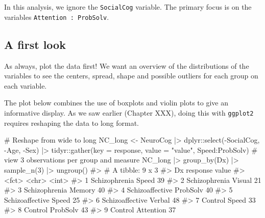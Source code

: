 \documentclass[
  letterpaper,
  10pt,
  krantz2]{krantz}
\makeatletter
\newenvironment{Shaded}{\begin{snugshade}}{\end{snugshade}}
\newcommand{\AttributeTok}[1]{\textcolor[rgb]{0.40,0.45,0.13}{#1}}
\newcommand{\CommentTok}[1]{\textcolor[rgb]{0.37,0.37,0.37}{#1}}
\newcommand{\DecValTok}[1]{\textcolor[rgb]{0.68,0.00,0.00}{#1}}
\newcommand{\FunctionTok}[1]{\textcolor[rgb]{0.28,0.35,0.67}{#1}}
\newcommand{\NormalTok}[1]{\textcolor[rgb]{0.00,0.23,0.31}{#1}}
\newcommand{\OtherTok}[1]{\textcolor[rgb]{0.00,0.23,0.31}{#1}}
\newcommand{\SpecialCharTok}[1]{\textcolor[rgb]{0.37,0.37,0.37}{#1}}
\newcommand{\StringTok}[1]{\textcolor[rgb]{0.13,0.47,0.30}{#1}}
\newenvironment{kframe}{%
  \medskip{}
  \setlength{\fboxsep}{.8em}
  \def\at@end@of@kframe{}%
  \ifinner\ifhmode%
  \def\at@end@of@kframe{\end{minipage}}%
  \begin{minipage}{\columnwidth}%
  \fi\fi%
  \def\FrameCommand##1{\hskip\@totalleftmargin \hskip-\fboxsep
  \colorbox{shadecolor}{##1}\hskip-\fboxsep
      \hskip-\linewidth \hskip-\@totalleftmargin \hskip\columnwidth}%
  \MakeFramed {\advance\hsize-\width
    \@totalleftmargin\z@ \linewidth\hsize
    \@setminipage}}%
{\par\unskip\endMakeFramed%
  \at@end@of@kframe}
\renewenvironment{Shaded}{\begin{kframe}}{\end{kframe}}
\makeatother
\begin{document}
In this analysis, we ignore the \texttt{SocialCog} variable. The primary
focus is on the variables \texttt{Attention\ :\ ProbSolv}.

\hypertarget{a-first-look}{%
\subsection{A first look}\label{a-first-look}}

As always, plot the data first! We want an overview of the distributions
of the variables to see the centers, spread, shape and possible outliers
for each group on each variable.

The plot below combines the use of boxplots and violin plots to give an
informative display. As we saw earlier (Chapter XXX), doing this with
\texttt{ggplot2} requires reshaping the data to long format.

\begin{Shaded}
\begin{Highlighting}[]
\CommentTok{\# Reshape from wide to long}
\NormalTok{NC\_long }\OtherTok{\textless{}{-}}\NormalTok{ NeuroCog }\SpecialCharTok{|\textgreater{}}
\NormalTok{  dplyr}\SpecialCharTok{::}\FunctionTok{select}\NormalTok{(}\SpecialCharTok{{-}}\NormalTok{SocialCog, }\SpecialCharTok{{-}}\NormalTok{Age, }\SpecialCharTok{{-}}\NormalTok{Sex) }\SpecialCharTok{|\textgreater{}}
\NormalTok{  tidyr}\SpecialCharTok{::}\FunctionTok{gather}\NormalTok{(}\AttributeTok{key =}\NormalTok{ response, }\AttributeTok{value =} \StringTok{"value"}\NormalTok{, Speed}\SpecialCharTok{:}\NormalTok{ProbSolv)}
\CommentTok{\# view 3 observations per group and measure}
\NormalTok{NC\_long }\SpecialCharTok{|\textgreater{}}
  \FunctionTok{group\_by}\NormalTok{(Dx) }\SpecialCharTok{|\textgreater{}}
  \FunctionTok{sample\_n}\NormalTok{(}\DecValTok{3}\NormalTok{) }\SpecialCharTok{|\textgreater{}} \FunctionTok{ungroup}\NormalTok{()}
\CommentTok{\#\textgreater{} \# A tibble: 9 x 3}
\CommentTok{\#\textgreater{}   Dx              response  value}
\CommentTok{\#\textgreater{}   \textless{}fct\textgreater{}           \textless{}chr\textgreater{}     \textless{}int\textgreater{}}
\CommentTok{\#\textgreater{} 1 Schizophrenia   Speed        39}
\CommentTok{\#\textgreater{} 2 Schizophrenia   Visual       21}
\CommentTok{\#\textgreater{} 3 Schizophrenia   Memory       40}
\CommentTok{\#\textgreater{} 4 Schizoaffective ProbSolv     40}
\CommentTok{\#\textgreater{} 5 Schizoaffective Speed        25}
\CommentTok{\#\textgreater{} 6 Schizoaffective Verbal       48}
\CommentTok{\#\textgreater{} 7 Control         Speed        33}
\CommentTok{\#\textgreater{} 8 Control         ProbSolv     43}
\CommentTok{\#\textgreater{} 9 Control         Attention    37}
\end{Highlighting}
\end{Shaded}
\end{document}
